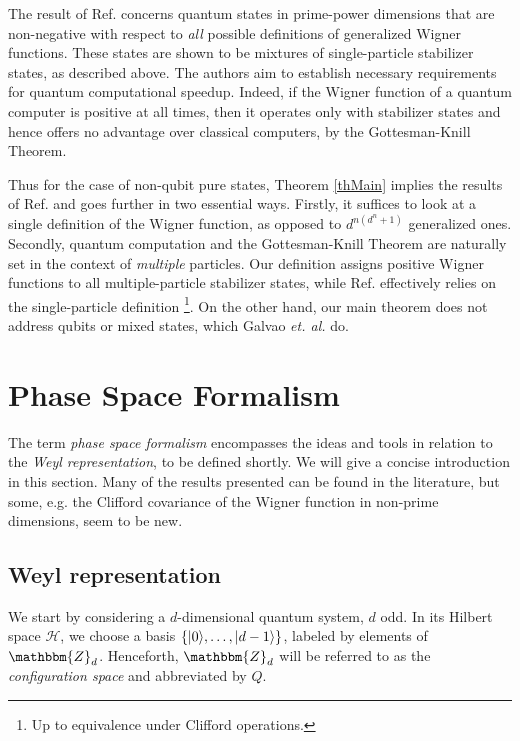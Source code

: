 \documentclass[aps,twocolumn,floatfix]{revtex4}
\def\ket#1.{|#1\rangle}
\def\ZZ{\mathbbm{Z}}
\def\H{\mathcal{H}}
\begin{document}
The result of Ref. \cite{galvao} concerns quantum states in
prime-power dimensions that are non-negative with respect to
\emph{all} possible definitions of generalized Wigner functions. These
states are shown to be mixtures of single-particle stabilizer states,
as described above.  The authors aim to establish necessary
requirements for quantum computational speedup. Indeed, if the Wigner
function of a quantum computer is positive at all times, then it
operates only with stabilizer states and hence offers no advantage
over classical computers, by the Gottesman-Knill Theorem.

Thus for the case of non-qubit pure states, Theorem \ref{thMain}
implies the results of Ref. \cite{galvao} and goes further in two
essential ways.  Firstly, it suffices to look at a single definition
of the Wigner function, as opposed to $d^{n(d^n+1)}$ generalized ones.
Secondly, quantum computation and the Gottesman-Knill Theorem are
naturally set in the context of \emph{multiple} particles. Our
definition assigns positive Wigner functions to all multiple-particle
stabilizer states, while Ref. \cite{galvao} effectively relies on the
single-particle definition \footnote{
	Up to equivalence under Clifford operations.
}. On the other hand, our main theorem does
not address qubits or mixed states, which Galvao \emph{et.  al.} do.

\section{Phase Space Formalism}
\label{scPhaseSpace}

The term \emph{phase space formalism} encompasses the ideas and tools
in relation to the \emph{Weyl representation}, to be defined shortly.
We will give a concise introduction in this section. Many of the
results presented can be found in the literature, but some, e.g. the
Clifford covariance of the Wigner function in non-prime dimensions,
seem to be new.

\subsection{Weyl representation}

We start by considering a $d$-dimensional quantum system, $d$ odd.  In
its Hilbert space $\H$, we choose a basis $\{\ket0.,
\dots,\nolinebreak{\ket d-1.}\}$, labeled by elements of $\ZZ_d$.
Henceforth, $\ZZ_d$ will be referred to as the \emph{configuration
space} and abbreviated by $Q$.
\end{document}
